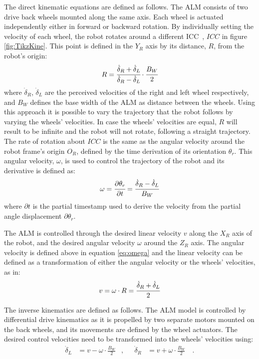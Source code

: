 The direct kinematic equations are defined as follows.
The \gls{ALM} consists of two drive back wheels mounted along the same axis.
Each wheel is actuated independently either in forward or backward rotation.
By individually setting the velocity of each wheel, the robot rotates around a different \gls{ICC}~\cite{ICC}, $ICC$ in figure \ref{fig:TikzKine}.
This point is defined in the $Y_R$ axis by its distance, $R$, from the robot's origin:
\begin{equation}
    R = \cfrac{\dot \delta_R + \dot \delta_L}{\dot \delta_R - \dot \delta_L} \cdot \cfrac{B_W}{2}
    \label{eq:R}
\end{equation}
where $\dot \delta_R$, $\dot \delta_L$ are the perceived velocities of the right and left wheel respectively, and $B_W$ defines the base width of the \gls{ALM} as distance between the wheels.
Using this approach it is possible to vary the trajectory that the robot follows by varying the wheels' velocities.
In case the wheels' velocities are equal, $R$ will result to be infinite and the robot will not rotate, following a straight trajectory.
The rate of rotation about $ICC$ is the same as the angular velocity around the robot frame's origin $O_R$, defined by the time derivation of its orientation $\theta_r$. 
This angular velocity, $\omega$, is used to control the trajectory of the robot and its derivative is defined as:
\begin{equation}
    \omega = \cfrac{\partial{\theta_r}}{\partial{t}} = \cfrac{\dot \delta_R - \dot \delta_L}{B_W}
    \label{eq:omega}
\end{equation}
where $\partial{t}$ is the partial timestamp used to derive the velocity from the partial angle displacement $\partial{\theta_r}$.

The \gls{ALM} is controlled through the desired linear velocity $v$ along the $X_R$ axis of the robot, and the desired angular velocity $\omega$ around the $Z_R$ axis.
The angular velocity is defined above in equation \eqref{eq:omega} and the linear velocity can be defined as a transformation of either the angular velocity or the wheels' velocities, as in:
\begin{equation}
    v = \omega \cdot R = \cfrac{\dot \delta_R + \dot \delta_L}{2}
    \label{eq:vel}
\end{equation}

The inverse kinematics are defined as follows.
The \gls{ALM} model is controlled by differential drive kinematics as it is propelled by two separate motors mounted on the back wheels, and its movements are defined by the wheel actuators. The desired control velocities need to be transformed into the wheels' velocities using:
\begin{align}
    \dot \delta _L  & = v - \omega \cdot \frac{B_W}{2} & , &&
    \dot \delta _R  & = v + \omega \cdot \frac{B_W}{2} \quad .
    \label{eq:wheel_vel}
\end{align}


